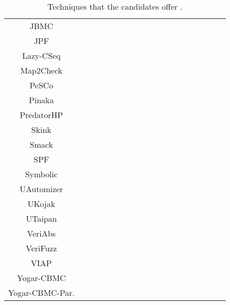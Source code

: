 \begin{table}[h]
{\begin{tabular}{C |  g c g c g c g c g c g c g c g c g c}
    \hline
    JBMC            &  &  &  &  &  &  &  &  &  &  &  &  &  &  &  &  &  &  \\
    JPF             &  &  &  &  &  &  &  &  &  &  &  &  &  &  &  &  &  &  \\
    \hline
    Lazy-CSeq       &  &  &  &  &  &  &  &  &  &  &  &  &  &  &  &  &  &  \\
    Map2Check       &  &  &  &  &  &  &  &  &  &  &  &  &  &  &  &  &  &  \\
    \hline
    PeSCo           &  &  &  &  &  &  &  &  &  &  &  &  &  &  &  &  &  &  \\
    Pinaka          &  &  &  &  &  &  &  &  &  &  &  &  &  &  &  &  &  &  \\
    \hline
    PredatorHP      &  &  &  &  &  &  &  &  &  &  &  &  &  &  &  &  &  &  \\
    Skink           &  &  &  &  &  &  &  &  &  &  &  &  &  &  &  &  &  &  \\
    \hline
    Smack           &  &  &  &  &  &  &  &  &  &  &  &  &  &  &  &  &  &  \\
    SPF             &  &  &  &  &  &  &  &  &  &  &  &  &  &  &  &  &  &  \\
    \hline
    Symbolic        &  &  &  &  &  &  &  &  &  &  &  &  &  &  &  &  &  &  \\
    UAutomizer      &  &  &  &  &  &  &  &  &  &  &  &  &  &  &  &  &  &  \\
	\hline
    UKojak          &  &  &  &  &  &  &  &  &  &  &  &  &  &  &  &  &  &  \\
    UTaipan         &  &  &  &  &  &  &  &  &  &  &  &  &  &  &  &  &  &  \\
	\hline
    VeriAbs         &  &  &  &  &  &  &  &  &  &  &  &  &  &  &  &  &  &  \\
    VeriFuzz        &  &  &  &  &  &  &  &  &  &  &  &  &  &  &  &  &  &  \\
	\hline
    VIAP            &  &  &  &  &  &  &  &  &  &  &  &  &  &  &  &  &  &  \\
    Yogar-CBMC      &  &  &  &  &  &  &  &  &  &  &  &  &  &  &  &  &  &  \\
	\hline
    Yogar-CBMC-Par. &  &  &  &  &  &  &  &  &  &  &  &  &  &  &  &  &  &  \\
	\end{tabular}
    }

\caption{Techniques that the  candidates offer \cite{SVCOMP2019}.}
\label{tab:svcomp}
\end{table}

